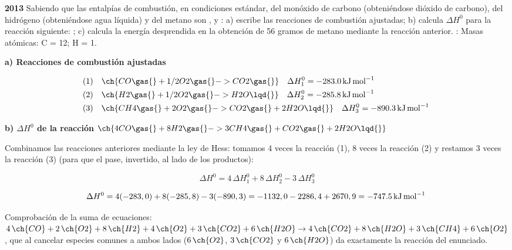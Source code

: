 \begin{exerciseEVAU}
    \textbf{2013} Sabiendo que las entalpías de combustión, en condiciones estándar, del monóxido de carbono
    (obteniéndose dióxido de carbono), del hidrógeno (obteniéndose agua líquida) y del metano son ,  y : a) escribe las reacciones de combustión ajustadas; b) calcula \(\Delta H^0\) para la reacción siguiente:  ; c) calcula la energía desprendida en la obtención de 56 gramos de metano mediante la reacción anterior.
    \datos{}: Masas atómicas: C = 12; H = 1.

    \begin{solu}

        \textbf{a) Reacciones de combustión ajustadas}

        \begin{align*}
            \text{(1)} \quad & \ch{CO \gas{} + 1/2 O2 \gas{} -> CO2 \gas{}} \quad \Delta H^0_1 = \energia[kjmol]{-283.0} \\
            \text{(2)} \quad & \ch{H2 \gas{} + 1/2 O2 \gas{} -> H2O \lqd{}} \quad \Delta H^0_2 = \energia[kjmol]{-285.8} \\
            \text{(3)} \quad & \ch{CH4 \gas{} + 2 O2 \gas{} -> CO2 \gas{} + 2 H2O \lqd{}} \quad \Delta H^0_3 = \energia[kjmol]{-890.3}
        \end{align*}

        \textbf{b) \(\Delta H^0\) de la reacción} \(\ch{4 CO \gas{} + 8 H2 \gas{} -> 3 CH4 \gas{} + CO2 \gas{} + 2 H2O \lqd{}}\)

        Combinamos las reacciones anteriores mediante la ley de Hess: tomamos 4 veces la reacción (1), 8 veces la reacción (2) y restamos 3 veces la reacción (3) (para que el  pase, invertido, al lado de los productos):

        \begin{equation*}
            \Delta H^0 = 4\, \Delta H^0_1 + 8\, \Delta H^0_2 - 3\, \Delta H^0_3
        \end{equation*}

        \begin{equation*}
            \Delta H^0 = 4(-283,0) + 8(-285,8) - 3(-890,3) = -1132,0 - 2286,4 + 2670,9 = \energia[kjmol]{-747.5}
        \end{equation*}

        Comprobación de la suma de ecuaciones: \(4\,\ch{CO} + 2\,\ch{O2} + 8\,\ch{H2} + 4\,\ch{O2} + 3\,\ch{CO2} + 6\,\ch{H2O} \to 4\,\ch{CO2} + 8\,\ch{H2O} + 3\,\ch{CH4} + 6\,\ch{O2}\), que al cancelar especies comunes a ambos lados (\(6\,\ch{O2}\), \(3\,\ch{CO2}\) y \(6\,\ch{H2O}\)) da exactamente la reacción del enunciado.


\end{solu}
\end{exerciseEVAU}
